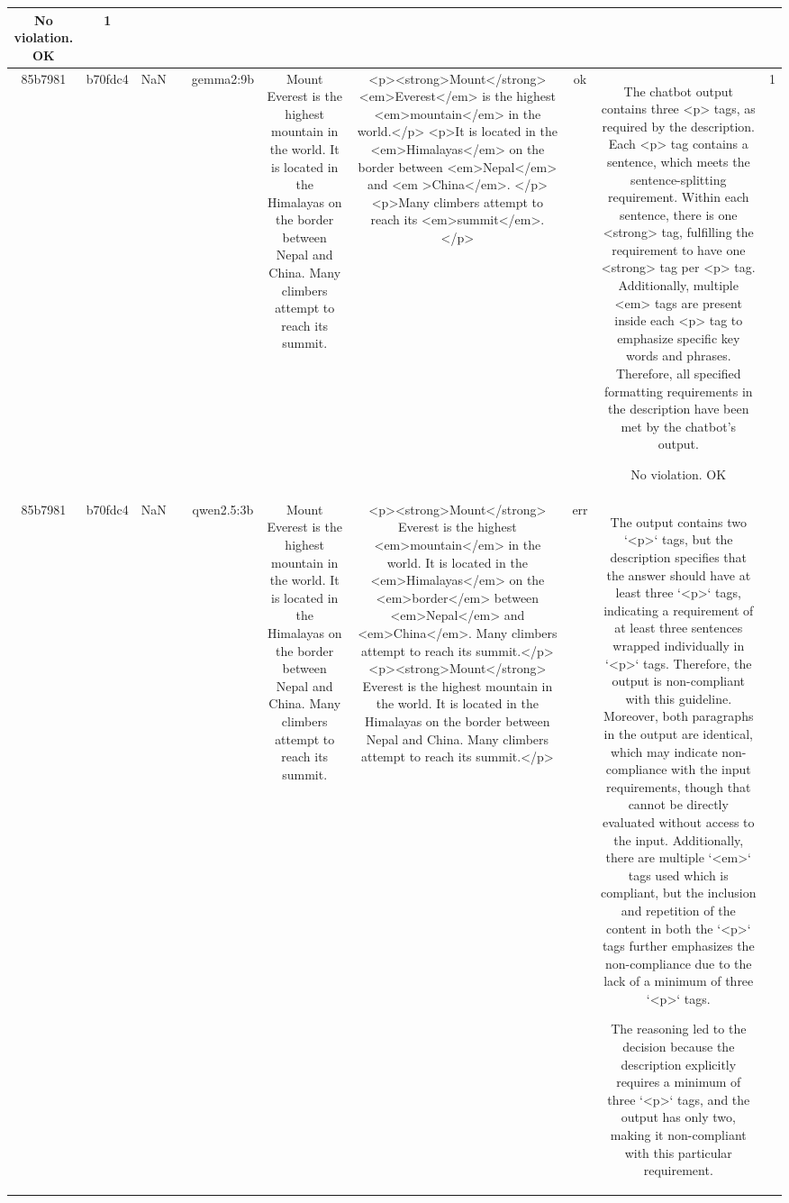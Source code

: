 \begin{table}[h!]
\begin{tabular}{|c|c|c|c|c|c|c|c|c|c|}
No violation.
OK & 1\\
\hline
85b7981 & b70fdc4 & NaN &  & gemma2:9b & Mount Everest is the highest mountain in the world. It is located in the Himalayas on the border between Nepal and China. Many climbers attempt to reach its summit. & <p><strong>Mount</strong> <em>Everest</em> is the highest <em>mountain</em> in the world.</p>
<p>It is located in the <em>Himalayas</em> on the border between <em>Nepal</em> and <em >China</em>. </p>
<p>Many climbers attempt to reach its <em>summit</em>.</p>  


 & ok & The chatbot output contains three <p> tags, as required by the description. Each <p> tag contains a sentence, which meets the sentence-splitting requirement. Within each sentence, there is one <strong> tag, fulfilling the requirement to have one <strong> tag per <p> tag. Additionally, multiple <em> tags are present inside each <p> tag to emphasize specific key words and phrases. Therefore, all specified formatting requirements in the description have been met by the chatbot's output.

No violation.
OK & 1\\
\hline
85b7981 & b70fdc4 & NaN &  & qwen2.5:3b & Mount Everest is the highest mountain in the world. It is located in the Himalayas on the border between Nepal and China. Many climbers attempt to reach its summit. & <p><strong>Mount</strong> Everest is the highest <em>mountain</em> in the world. It is located in the <em>Himalayas</em> on the <em>border</em> between <em>Nepal</em> and <em>China</em>. Many climbers attempt to reach its summit.</p>
<p><strong>Mount</strong> Everest is the highest mountain in the world. It is located in the Himalayas on the border between Nepal and China. Many climbers attempt to reach its summit.</p> & err & The output contains two `<p>` tags, but the description specifies that the answer should have at least three `<p>` tags, indicating a requirement of at least three sentences wrapped individually in `<p>` tags. Therefore, the output is non-compliant with this guideline. Moreover, both paragraphs in the output are identical, which may indicate non-compliance with the input requirements, though that cannot be directly evaluated without access to the input. Additionally, there are multiple `<em>` tags used which is compliant, but the inclusion and repetition of the content in both the `<p>` tags further emphasizes the non-compliance due to the lack of a minimum of three `<p>` tags.

The reasoning led to the decision because the description explicitly requires a minimum of three `<p>` tags, and the output has only two, making it non-compliant with this particular requirement.


\end{tabular}
\end{table}
